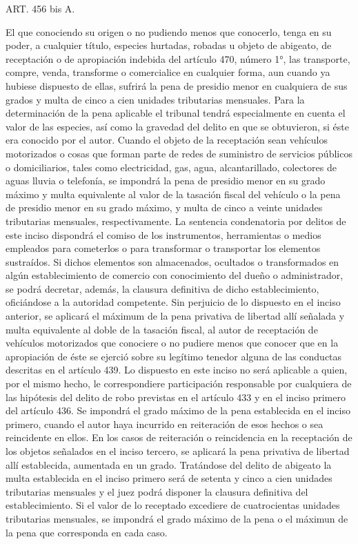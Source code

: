    ART. 456 bis A.

    El que conociendo su origen o no pudiendo menos que conocerlo, tenga en su poder, a cualquier título, especies hurtadas, robadas u objeto de abigeato, de receptación o de apropiación indebida del artículo 470, número 1°, las transporte, compre, venda, transforme o comercialice en cualquier forma, aun cuando ya hubiese dispuesto de ellas, sufrirá la pena de presidio menor en cualquiera de sus grados y multa de cinco a cien unidades tributarias mensuales.
    Para la determinación de la pena aplicable el tribunal tendrá especialmente en cuenta el valor de las especies, así como la gravedad del delito en que se obtuvieron, si éste era conocido por el autor.
    Cuando el objeto de la receptación sean vehículos motorizados o cosas que forman parte de redes de suministro de servicios públicos o domiciliarios, tales como electricidad, gas, agua, alcantarillado, colectores de aguas lluvia o telefonía, se impondrá la pena de presidio menor en su grado máximo y multa equivalente al valor de la tasación fiscal del vehículo o la pena de presidio menor en su grado máximo, y multa de cinco a veinte unidades tributarias mensuales, respectivamente. La sentencia condenatoria por delitos de este inciso dispondrá el comiso de los instrumentos, herramientas o medios empleados para cometerlos o para transformar o transportar los elementos sustraídos. Si dichos elementos son almacenados, ocultados o transformados en algún establecimiento de comercio con conocimiento del dueño o administrador, se podrá decretar, además, la clausura definitiva de dicho establecimiento, oficiándose a la autoridad competente.
    Sin perjuicio de lo dispuesto en el inciso anterior, se aplicará el máximum de la pena privativa de libertad allí señalada y multa equivalente al doble de la tasación fiscal, al autor de receptación de vehículos motorizados que conociere o no pudiere menos que conocer que en la apropiación de éste se ejerció sobre su legítimo tenedor alguna de las conductas descritas en el artículo 439. Lo dispuesto en este inciso no será aplicable a quien, por el mismo hecho, le correspondiere participación responsable por cualquiera de las hipótesis del delito de robo previstas en el artículo 433 y en el inciso primero del artículo 436.
    Se impondrá el grado máximo de la pena establecida en el inciso primero, cuando el autor haya incurrido en reiteración de esos hechos o sea reincidente en ellos. En los casos de reiteración o reincidencia en la receptación de los objetos señalados en el inciso tercero, se aplicará la pena privativa de libertad allí establecida, aumentada en un grado.
    Tratándose del delito de abigeato la multa establecida en el inciso primero será de setenta y cinco a cien unidades tributarias mensuales y el juez podrá disponer la clausura definitiva del establecimiento.
    Si el valor de lo receptado excediere de cuatrocientas unidades tributarias mensuales, se impondrá el grado máximo de la pena o el máximun de la pena que corresponda en cada caso.



